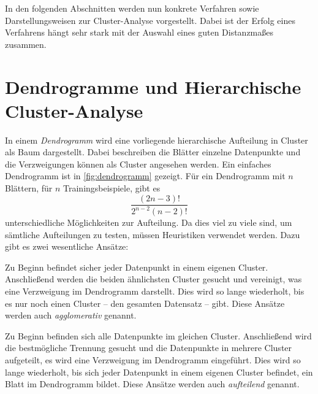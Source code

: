 	In den folgenden Abschnitten werden nun konkrete Verfahren sowie Darstellungsweisen zur Cluster-Analyse vorgestellt. Dabei ist der Erfolg eines Verfahrens hängt sehr stark mit der Auswahl eines guten Distanzmaßes zusammen.

	\section{Dendrogramme und Hierarchische Cluster-Analyse}
		In einem \emph{Dendrogramm} wird eine vorliegende hierarchische Aufteilung in Cluster als Baum dargestellt. Dabei beschreiben die Blätter einzelne Datenpunkte und die Verzweigungen können als Cluster angesehen werden. Ein einfaches Dendrogramm ist in \autoref{fig:dendrogramm} gezeigt. Für ein Dendrogramm mit \(n\) Blättern, \dh für \(n\) Trainingsbeispiele, gibt es
		\begin{equation}
			\frac{(2n - 3)!}{2^{n - 2} (n - 2)!}
		\end{equation}
		unterschiedliche Möglichkeiten zur Aufteilung. Da dies viel zu viele sind, um sämtliche Aufteilungen zu testen, müssen Heuristiken verwendet werden. Dazu gibt es zwei wesentliche Ansätze:
		\begin{description}[leftmargin = 2.5cm]
			\item[Bottom-Up] Zu Beginn befindet sicher jeder Datenpunkt in einem eigenen Cluster. Anschließend werden die beiden ähnlichsten Cluster gesucht und vereinigt, was eine Verzweigung im Dendrogramm darstellt. Dies wird so lange wiederholt, bis es nur noch einen Cluster -- den gesamten Datensatz -- gibt. Diese Ansätze werden auch \emph{agglomerativ} genannt.
			\item[Top-Down] Zu Beginn befinden sich alle Datenpunkte im gleichen Cluster. Anschließend wird die bestmögliche Trennung gesucht und die Datenpunkte in mehrere Cluster aufgeteilt, \dh es wird eine Verzweigung im Dendrogramm eingeführt. Dies wird so lange wiederholt, bis sich jeder Datenpunkt in einem eigenen Cluster befindet, \dh ein Blatt im Dendrogramm bildet. Diese Ansätze werden auch \emph{aufteilend} genannt.
		\end{description}

